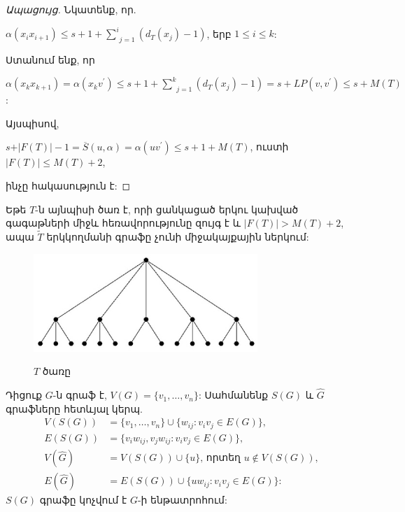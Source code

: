 \begin{hide}
\begin{proof}[Ապացույց]
Նկատենք, որ.
\begin{center}
$\alpha(x_{i}x_{i+1})\leq s+1+\underset{j=1}{\overset{i}{\sum
}}(d_{T}(x_{j})-1)$, երբ $1\leq i\leq k$:
\end{center}

Ստանում ենք, որ
\begin{center}
$\alpha(x_{k}x_{k+1})=\alpha(x_{k}v^{\prime})\leq
s+1+\underset{j=1}{\overset{k}{\sum
}}(d_{T}(x_{j})-1)=s+LP(v,v^{\prime})\leq s+M(T)$:
\end{center}

Այսպիսով,
\begin{center}
$s+\vert F(T)\vert -1=\overline{S}(u,\alpha)=\alpha(uv^{\prime})\leq
s+1+M(T)$, ուստի $\vert F(T)\vert\leq M(T)+2$,
\end{center}
ինչը հակասություն է:
\end{proof}

\begin{corollary}
\label{c3_tree} Եթե $T$-ն այնպիսի ծառ է, որի ցանկացած երկու կախված գագաթների միջև հեռավորությունը զույգ է և $\vert F(T)\vert >
M(T)+2$, ապա $\widetilde{T}$ երկկողմանի գրաֆը չունի միջակայքային ներկում:
\end{corollary}

\begin{figure}[h]
\begin{center}
\includegraphics[width=20pc]{figures/tree.eps}\\
\caption{$T$ ծառը}\label{f3_tree}
\end{center}
\end{figure}
\end{hide}

Դիցուք $G$-ն գրաֆ է, $V(G)=\{v_{1},\ldots,v_{n}\}$: Սահմանենք 
$S(G)$ և $\widehat{G}$ գրաֆները հետևյալ կերպ.
\begin{align*}
V(S(G))&=\{v_{1},\ldots,v_{n}\}\cup \{w_{ij}:v_{i}v_{j}\in E(G)\},\\
E(S(G))&=\{v_{i}w_{ij},v_{j}w_{ij}:v_{i}v_{j}\in E(G)\},\\
V(\widehat{G})&=V(S(G))\cup \{u\}\text{, որտեղ } u\notin V(S(G)),\\
E(\widehat{G})&=E(S(G))\cup \{uw_{ij}:v_{i}v_{j}\in E(G)\}:
\end{align*}
$S(G)$ գրաֆը կոչվում է $G$-ի ենթատրոհում:

